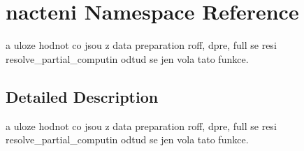 \hypertarget{namespacenacteni}{\section{nacteni Namespace Reference}
\label{namespacenacteni}
}


a uloze hodnot co jsou z data preparation roff, dpre, full se resi resolve\-\_\-partial\-\_\-computin odtud se jen vola tato funkce.  




\subsection{Detailed Description}
a uloze hodnot co jsou z data preparation roff, dpre, full se resi resolve\-\_\-partial\-\_\-computin odtud se jen vola tato funkce. 